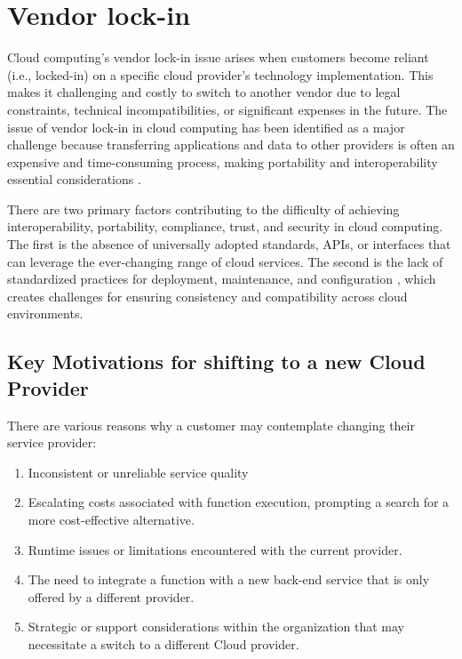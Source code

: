 \chapter{Vendor lock-in}
\label{chap:vendor-lock-in}

Cloud computing's vendor lock-in issue arises when customers become reliant (i.e., locked-in) on a specific cloud provider's technology implementation. This makes it challenging and costly to switch to another vendor due to legal constraints, technical incompatibilities, or significant expenses in the future. The issue of vendor lock-in in \gls{cloud computing} has been identified as a major challenge because transferring applications and data to other providers is often an expensive and time-consuming process, making portability and interoperability essential considerations \cite{guest_2013_oracle}.

There are two primary factors contributing to the difficulty of achieving interoperability, portability, compliance, trust, and security in cloud computing. The first is the absence of universally adopted standards, APIs, or interfaces that can leverage the ever-changing range of cloud services. The second is the lack of standardized practices for deployment, maintenance, and configuration \cite{oparamartins_2014_critical}, which creates challenges for ensuring consistency and compatibility across cloud environments. 

\section{Key Motivations for shifting to a new Cloud Provider}
There are various reasons why a customer may contemplate changing their service provider:

\begin{enumerate}
    \item Inconsistent or unreliable service quality
    \item Escalating costs associated with function execution, prompting a search for a more cost-effective alternative.
    \item Runtime issues or limitations encountered with the current provider.
    \item The need to integrate a function with a new back-end service that is only offered by a different provider.
    \item Strategic or support considerations within the organization that may necessitate a switch to a different Cloud provider.
\end{enumerate}


